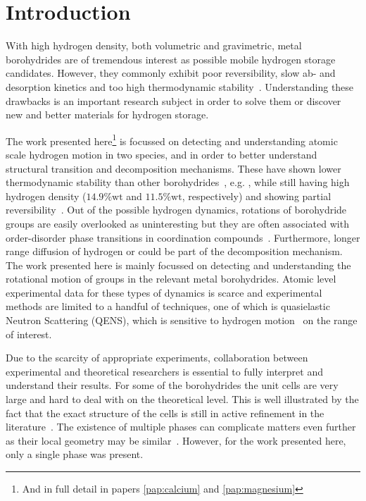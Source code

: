 \section{Introduction}
\label{sec:borohydrides-introduction}
With high hydrogen density, both volumetric and gravimetric, metal borohydrides are of tremendous interest as possible mobile hydrogen storage candidates.
However, they commonly exhibit poor reversibility, slow ab- and desorption kinetics and too high thermodynamic stability~\cite{lithium-stability-2003, borohydride-stability-2006, calcium-stability-2006}.
Understanding these drawbacks is an important research subject in order to solve them or discover new and better materials for hydrogen storage.

The work presented here\footnote{And in full detail in papers \ref{pap:calcium} and \ref{pap:magnesium}} is focussed on detecting and understanding atomic scale hydrogen motion in two species,  and  in order to better understand structural transition and decomposition mechanisms.
These have shown lower thermodynamic stability than other borohydrides~\cite{borohydride-stability-2006, calcium-stability-2006}, e.g. , while still having high hydrogen density ($14.9\%\text{wt}$ and $11.5\%\text{wt}$, respectively) and showing partial reversibility~\cite{magnesium-reversibility-severa-2010, magnesium-reversibility-chong-2011, calcium-reversibility-2007, calcium-reversibility-2008, reversibility-destabilisation-2008}.
Out of the possible hydrogen dynamics, rotations of borohydride groups are easily overlooked as uninteresting but they are often associated with order-disorder phase transitions in coordination compounds~\cite{order-disorder-2010, order-disorder-2006}.
Furthermore, longer range diffusion of hydrogen or  could be part of the decomposition mechanism.
The work presented here is mainly focussed on detecting and understanding the rotational motion of  groups in the relevant metal borohydrides.
Atomic level experimental data for these types of dynamics is scarce and experimental methods are limited to a handful of techniques, one of which is quasielastic Neutron Scattering (QENS), which is sensitive to hydrogen motion~\cite{qens-bee-1988} on the range of interest.

Due to the scarcity of appropriate experiments, collaboration between experimental and theoretical researchers is essential to fully interpret and understand their results.
For some of the borohydrides the unit cells are very large and hard to deal with on the theoretical level.
This is well illustrated by the fact that the exact structure of the cells is still in active refinement in the literature~\cite{cabh42-structure-p42m, cabh42-structure-p4}.
The existence of multiple phases can complicate matters even further as their local geometry may be similar~\cite{mgbh42-structure-fddd, mgbh42-phases-2007, mgbh42-phases-2008, mgbh42-phases-2009}.
However, for the work presented here, only a single phase was present.
